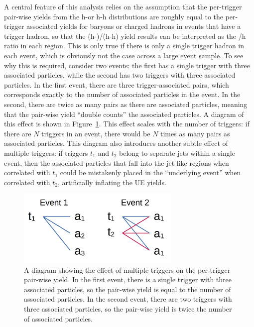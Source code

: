 A central feature of this analysis relies on the assumption that the per-trigger pair-wise yields from the h-\lmb or h-h distributions are roughly equal to the per-trigger associated yields for \lmb baryons or charged hadrons in events that have a trigger hadron, so that the (h-\lmb)/(h-h) yield results can be interpreted as the \lmb/h ratio in each region. This is only true if there is only a single trigger hadron in each event, which is obviously not the case across a large event sample. To see why this is required, consider two events: the first has a single trigger with three associated particles, while the second has two triggers with three associated particles. In the first event, there are three trigger-associated pairs, which corresponds exactly to the number of associated particles in the event. In the second, there are twice as many pairs as there are associated particles, meaning that the pair-wise yield ``double counts'' the associated particles. A diagram of this effect is shown in Figure~\ref{fig:pairwise_counting}. This effect scales with the number of triggers: if there are $N$ triggers in an event, there would be $N$ times as many pairs as associated particles. This diagram also introduces another subtle effect of multiple triggers: if triggers $t_1$ and $t_2$ belong to separate jets within a single event, then the associated particles that fall into the jet-like regions when correlated with $t_1$ could be mistakenly placed in the ``underlying event'' when correlated with $t_2$, artificially inflating the UE yields.

\begin{figure}[ht]
    \centering
    \includegraphics[width=0.7\textwidth]{figures/analysis/pair_counting_diagram.png}
    \caption{A diagram showing the effect of multiple triggers on the per-trigger pair-wise yield. In the first event, there is a single trigger with three associated particles, so the pair-wise yield is equal to the number of associated particles. In the second event, there are two triggers with three associated particles, so the pair-wise yield is twice the number of associated particles.}
    \label{fig:pairwise_counting}
\end{figure}

